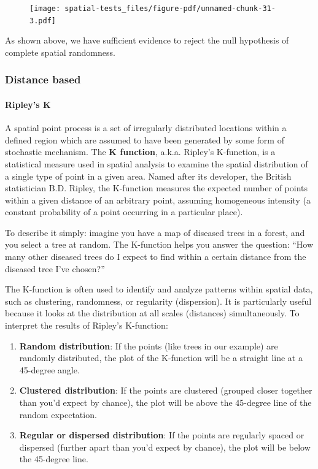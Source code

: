 \documentclass[
  letterpaper,
]{book}
\let\oldparagraph\paragraph
\renewcommand{\paragraph}[1]{\oldparagraph{#1}\mbox{}}
\begin{document}
\begin{figure}[H]

{\centering \texttt{[image: spatial-tests\_files/figure-pdf/unnamed-chunk-31-3.pdf]}

}

\end{figure}

As shown above, we have sufficient evidence to reject the null
hypothesis of complete spatial randomness.

\hypertarget{distance-based}{%
\subsubsection{Distance based}\label{distance-based}}

\hypertarget{ripleys-k}{%
\paragraph{Ripley's K}\label{ripleys-k}}

A spatial point process is a set of irregularly distributed locations
within a defined region which are assumed to have been generated by some
form of stochastic mechanism. The \textbf{K function}, a.k.a. Ripley's
K-function, is a statistical measure used in spatial analysis to examine
the spatial distribution of a single type of point in a given area.
Named after its developer, the British statistician B.D. Ripley, the
K-function measures the expected number of points within a given
distance of an arbitrary point, assuming homogeneous intensity (a
constant probability of a point occurring in a particular place).

To describe it simply: imagine you have a map of diseased trees in a
forest, and you select a tree at random. The K-function helps you answer
the question: ``How many other diseased trees do I expect to find within
a certain distance from the diseased tree I've chosen?''

The K-function is often used to identify and analyze patterns within
spatial data, such as clustering, randomness, or regularity
(dispersion). It is particularly useful because it looks at the
distribution at all scales (distances) simultaneously. To interpret the
results of Ripley's K-function:

\begin{enumerate}
\def\labelenumi{\arabic{enumi}.}
\item
  \textbf{Random distribution}: If the points (like trees in our
  example) are randomly distributed, the plot of the K-function will be
  a straight line at a 45-degree angle.
\item
  \textbf{Clustered distribution}: If the points are clustered (grouped
  closer together than you'd expect by chance), the plot will be above
  the 45-degree line of the random expectation.
\item
  \textbf{Regular or dispersed distribution}: If the points are
  regularly spaced or dispersed (further apart than you'd expect by
  chance), the plot will be below the 45-degree line.
\end{enumerate}
\end{document}
